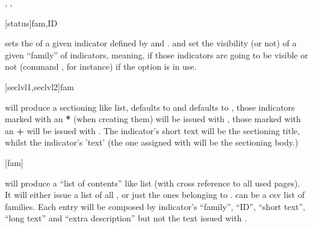 \documentclass[article,nofontwarning,nogeometry,english,tocdepth=3,secdepth=3]{ufrgscca} %
\begin{document}
\begin{codedescribe}{\indsetstatus, \indsetview, \indsethide}
	\begin{codesyntax}%
	\tsmacro{\indsetstatus}[status]{fam,ID}
\end{codesyntax}
 sets the  of a given indicator defined by  and . \tsmacro{\indsetview}{} and  set the visibility (or not) of a given “family” of indicators, meaning, if those indicators are going to be visible or not (command \tsmacro{\indref}{}, for instance) if the option  is in use.
\end{codedescribe}

\begin{codedescribe}{\lstind}
	\begin{codesyntax}%
	\tsmacro{\lstind}[seclvl1,seclvl2]{fam}
\end{codesyntax}
\tsmacro{\lstind}{} will produce a sectioning like list,  defaults to \tsmacro{\section}{} and  defaults to \tsmacro{\subsection}{}, those indicators marked with an \textbf{*} (when creating them) will be issued with , those marked with an \textbf{+} will be issued with . The indicator's short text will be the sectioning title, whilst the indicator's 'text' (the one assigned with  will be the sectioning body.)
\end{codedescribe}

\begin{codedescribe}{\PrintIndicators}
    \begin{codesyntax}%
        \tsmacro{\PrintIndicators}[fam]{}
    \end{codesyntax}
    \tsmacro{\PrintIndicators}{} will produce a “list of contents” like list (with cross reference to all used \tsmacro{\indref}{} pages). It will either issue a list of all \tsmacro{\declareindicator}, or just the ones belonging to .  can be a csv list of families. Each entry will be composed by indicator's “family”, “ID”, “short text”, “long text” and “extra description” but not the text issued with \tsmacro{\indicatorText}{}.
\end{codedescribe}
\end{document}
